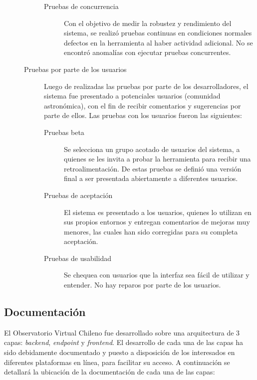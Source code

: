 \begin{description}
\begin{description}
\begin{description}
					\item[Pruebas de concurrencia] Con el objetivo de medir la robustez y rendimiento del sistema, se realizó pruebas continuas en condiciones normales defectos en la herramienta al haber actividad adicional. No se encontró anomalías con ejecutar pruebas concurrentes.
				\end{description}
			\item [Pruebas por parte de los usuarios] Luego de realizadas las pruebas por parte de los desarrolladores, el sistema fue presentado a potenciales usuarios (comunidad astronómica), con el fin de recibir comentarios y sugerencias por parte de ellos. Las pruebas con los usuarios fueron las siguientes:
				\begin{description}
					\item[Pruebas beta] Se selecciona un grupo acotado de usuarios del sistema, a quienes se les invita a probar la herramienta para recibir una retroalimentación. De estas pruebas se definió una versión final a ser presentada abiertamente a diferentes usuarios.
					\item[Pruebas de aceptación] El sistema es presentado a los usuarios, quienes lo utilizan en sus propios entornos y entregan comentarios de mejoras muy menores, las cuales han sido corregidas para su completa aceptación.
					\item[Pruebas de usabilidad] Se chequea con usuarios que la interfaz sea fácil de utilizar y entender. No hay reparos por parte de los usuarios.
				\end{description}
		\end{description}
\end{description}

\subsection{Documentación}\label{sec:doc}

El Observatorio Virtual Chileno fue desarrollado sobre una arquitectura de 3 capas: \emph{backend}, \emph{endpoint} y \emph{frontend}. El desarrollo de cada una de las capas ha sido debidamente documentado y puesto a disposición de los interesados en diferentes plataformas en línea, para facilitar su acceso. A continuación se detallará la ubicación de la documentación de cada una de las capas:

